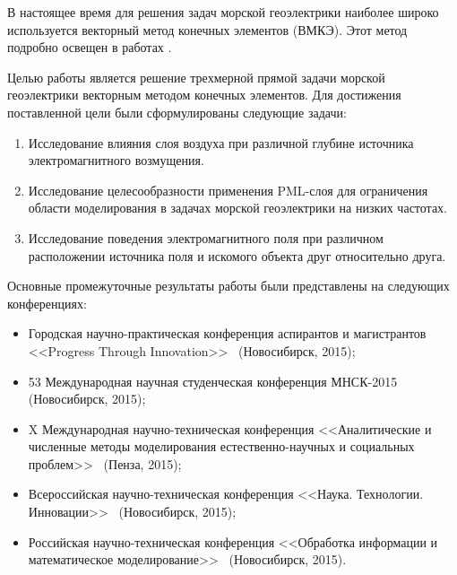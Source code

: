 \documentclass[a4paper,14pt]{article}
\begin{document}
В настоящее время для решения задач морской геоэлектрики наиболее широко используется векторный метод конечных элементов (ВМКЭ). Этот метод подробно освещен в работах \citep{balandin_vfem, monk}.

Целью работы является решение трехмерной прямой задачи морской геоэлектрики векторным методом конечных элементов. Для достижения поставленной цели были сформулированы следующие задачи:
\begin{enumerate}
	\item Исследование влияния слоя воздуха при различной глубине источника электромагнитного возмущения.
	\item Исследование целесообразности применения PML-слоя для ограничения области моделирования в задачах морской геоэлектрики на низких частотах.
	\item Исследование поведения электромагнитного поля при различном расположении источника поля и искомого объекта друг относительно друга.
\end{enumerate}

\pagebreak

Основные промежуточные результаты работы были представлены на следующих конференциях:
\begin{itemize}
	\item Городская научно-практическая конференция аспирантов и магистрантов <<Progress Through Innovation>>~\citep{conf_english_2015} (Новосибирск, 2015);
	\item 53 Международная научная студенческая конференция МНСК-2015~\citep{conf_mnsk_academ_2015} (Новосибирск, 2015);
	\item X Международная научно-техническая конференция <<Аналитические и численные методы моделирования естественно-научных и социальных проблем>>~\citep{conf_achm_2015} (Пенза, 2015);
	\item Всероссийская научно-техническая конференция <<Наука. Технологии. Инновации>>~\citep{conf_nti_2015} (Новосибирск, 2015);
	\item Российская научно-техническая конференция <<Обработка информации и математическое моделирование>>~\citep{conf_radio_day_2015} (Новосибирск, 2015).
\end{itemize}

\end{document}
